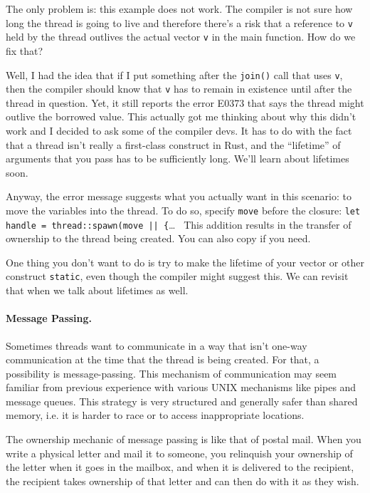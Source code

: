 \documentclass[a4paper]{report}
\begin{document}
The only problem is: this example does not work. The compiler is not sure how long the thread is going to live and therefore there's a risk that a reference to \texttt{v} held by the thread outlives the actual vector \texttt{v} in the main function. How do we fix that?

Well, I had the idea that if I put something after the \texttt{join()} call that uses \texttt{v}, then the compiler should know that \texttt{v} has to remain in existence until after the thread in question. Yet, it still reports the error E0373 that says the thread might outlive the borrowed value. This actually got me thinking about why this didn't work and I decided to ask some of the compiler devs. It has to do with the fact that a thread isn't really a first-class construct in Rust, and the ``lifetime'' of arguments that you pass has to be sufficiently long. We'll learn about lifetimes soon.

Anyway, the error message suggests what you actually want in this scenario: to move the variables into the thread. To do so, specify \texttt{move} before the closure: \texttt{let handle = thread::spawn(move || \{}\ldots~ This addition results in the transfer of ownership to the thread being created. You can also copy if you need. 

One thing you don't want to do is try to make the lifetime of your vector or other construct \texttt{static}, even though the compiler might suggest this. We can revisit that when we talk about lifetimes as well.

\paragraph{Message Passing.} Sometimes threads want to communicate in a way that isn't one-way communication at the time that the thread is being created. For that, a possibility is message-passing. This mechanism of communication may seem familiar from previous experience with various UNIX mechanisms like pipes and message queues. This strategy is very structured and generally safer than shared memory, i.e. it is harder to race or to access inappropriate locations.

The ownership mechanic of message passing is like that of postal mail. When you write a physical letter and mail it to someone, you relinquish your ownership of the letter when it goes in the mailbox, and when it is delivered to the recipient, the recipient takes ownership of that letter and can then do with it as they wish.
\end{document}
